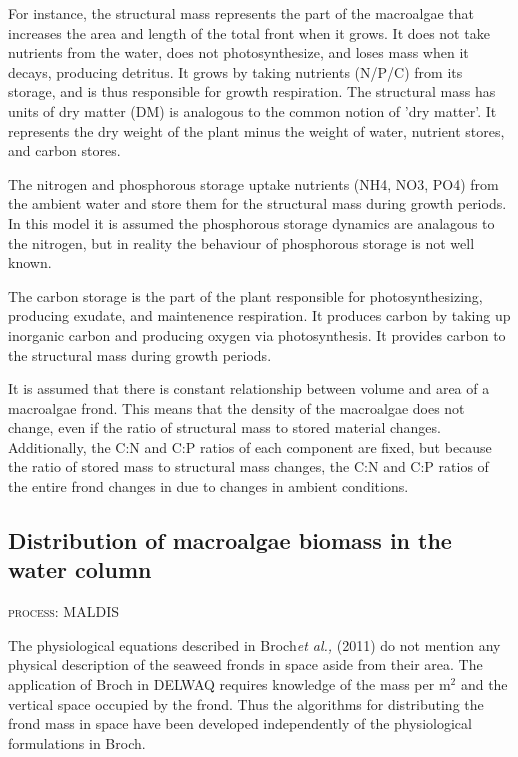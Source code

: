\documentclass{deltares_manual}
\begin{document}
For instance, the structural mass represents the part of the macroalgae that increases the area and length of the total front when it grows. It does not take nutrients from the water, does not photosynthesize, and loses mass when it decays, producing detritus. It grows by taking nutrients (N/P/C) from its storage, and is thus responsible for growth respiration. The structural mass has units of dry matter (DM) is analogous to the common notion of 'dry matter'. It represents the dry weight of the plant minus the weight of water, nutrient stores, and carbon stores.
 
The nitrogen and phosphorous storage uptake nutrients (NH4, NO3, PO4) from the ambient water and store them for the structural mass during growth periods. In this model it is assumed the phosphorous storage dynamics are analagous to the nitrogen, but in reality the behaviour of phosphorous storage is not well known.

The carbon storage is the part of the plant responsible for photosynthesizing, producing exudate, and maintenence respiration. It produces carbon by taking up inorganic carbon and producing oxygen via photosynthesis. It provides carbon to the structural mass during growth periods. 

It is assumed that there is constant relationship between volume and area of a macroalgae frond. This means that the density of the macroalgae does not change, even if the ratio of structural mass to stored material changes. Additionally, the C:N and C:P ratios of each component are fixed, but because the ratio of stored mass to structural mass changes, the C:N and C:P ratios of the entire frond changes in due to changes in ambient conditions.

\subsection{Distribution of macroalgae biomass in the water column}
\begin{flushright}
	\textsc{process: MALDIS}
\end{flushright}
The physiological equations described in Broch\textit{et al.,} (2011) do not mention any physical description of the seaweed fronds in space aside from their area. The application of Broch in DELWAQ requires knowledge of the mass per m$^{2}$ and the vertical space occupied by the frond. Thus the algorithms for distributing the frond mass in space have been developed independently of the physiological formulations in Broch. 
\end{document}
